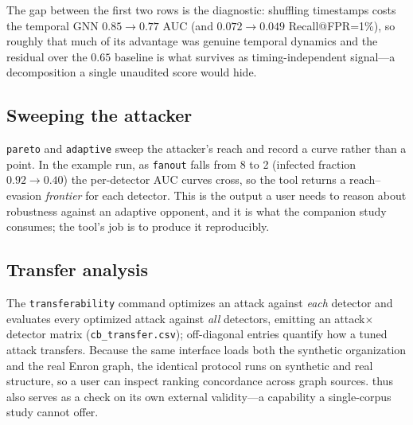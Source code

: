 The gap between the first two rows is the diagnostic: shuffling timestamps costs the temporal GNN
$0.85\!\to\!0.77$ AUC (and $0.072\!\to\!0.049$ Recall@FPR=1\%), so roughly that much of its advantage was
genuine temporal dynamics and the residual over the $0.65$ baseline is what survives as timing-independent
signal---a decomposition a single unaudited score would hide.

\subsection{Sweeping the attacker}
\texttt{pareto} and \texttt{adaptive} sweep the attacker's reach and record a curve rather than
a point. In the example run, as \texttt{fanout} falls from 8 to 2 (infected fraction
$0.92\!\to\!0.40$) the per-detector AUC curves cross, so the tool returns a reach--evasion
\emph{frontier} for each detector. This is the output a user needs to reason about robustness
against an adaptive opponent, and it is what the companion study consumes; the tool's job is to
produce it reproducibly.

\subsection{Transfer analysis}
The \texttt{transferability} command optimizes an attack against \emph{each} detector and
evaluates every optimized attack against \emph{all} detectors, emitting an
attack$\times$detector matrix (\texttt{cb\_transfer.csv}); off-diagonal entries quantify how a
tuned attack transfers. Because the same interface loads both the synthetic organization and
the real Enron graph, the identical protocol runs on synthetic and real structure, so a user
can inspect ranking concordance across graph sources. \tool thus also serves as a check on its
own external validity---a capability a single-corpus study cannot offer.